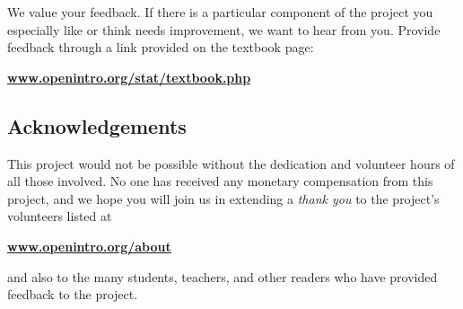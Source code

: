 We value your feedback. If there is a particular component of the project you especially like or think needs improvement, we want to hear from you. Provide feedback through a link provided on the textbook page:
\begin{center}
\href{http://www.openintro.org/stat/textbook.php}{\color{black}\textbf{www.openintro.org/stat/textbook.php}}
\end{center}


\subsection*{Acknowledgements}

This project would not be possible without the dedication and volunteer hours of all those involved. No one has received any monetary compensation from this project, and we hope you will join us in extending a \emph{thank you} to the project's volunteers listed at
\begin{center}
\href{http://www.openintro.org/about}{\color{black}\textbf{www.openintro.org/about}}
\end{center}
and also to the many students, teachers, and other readers who have provided feedback to the project.

